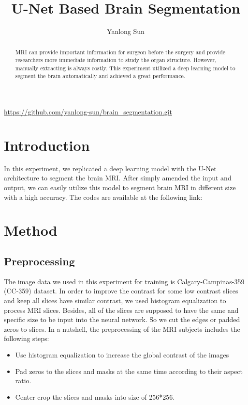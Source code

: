 \documentclass[12pt]{article}
\date{}
\title{U-Net Based Brain Segmentation}
\author{Yanlong Sun}
\begin{document}
\maketitle
 \urldef{\myurl}\url{https://github.com/yanlong-sun/brain_segmentation.git}

\begin{abstract}
MRI can provide important information for surgeon before the surgery and provide researchers more immediate information to study the organ structure. However, manually extracting is always costly. This experiment utilized a deep learning model to segment the brain automatically and achieved a great performance.
\end{abstract}

\section{Introduction}
In this experiment, we replicated a deep learning model with the U-Net architecture \cite{buda} to segment the brain MRI. After simply amended the input and output, we can easily utilize this model to segment brain MRI in different size with a high accuracy.  The codes are available at the following link: \myurl
\section{Method}

\subsection{Preprocessing}
The image data we used in this experiment for training is Calgary-Campinas-359 \cite{dataset}(CC-359) dataset. In order to improve the contrast for some low contrast slices and keep all slices have similar contrast, we used histogram equalization to process MRI slices. Besides, all of the slices are supposed to have the same and specific size to be input into the neural network. So we cut the edges or padded zeros to slices. In a nutshell, the preprocessing of the MRI subjects includes the following steps:
\begin{itemize}
	\item Use histogram equalization to increase the global contrast of the images 
	\item Pad zeros to the slices and masks at the same time according to their aspect ratio.
	\item Center crop the slices and masks into size of 256*256.
\end{itemize} 
\end{document}
